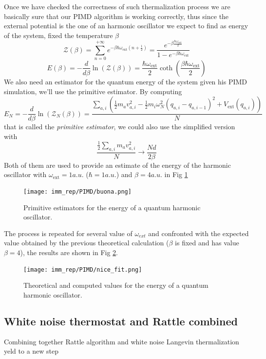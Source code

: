 \documentclass[10pt,a4paper]{article}
\begin{document}
 Once we have checked the correctness of such thermalization process we are basically sure that our PIMD algorithm is working correctly, thus since the external potential is the one of an harmonic oscillator we expect to find as energy of the system, fixed the temperature $\beta$ 
 \[\mathcal{Z}(\beta)= \sum_{n=0}^{+\infty} e^{-\beta\hbar\omega_{\text{ext}}(n+\frac{1}{2})} = \frac{e^{-\beta\frac{\hbar\omega_{\text{ext}}}{2}}}{1-e^{-\beta\hbar\omega_{\text{ext}}}}  \]
 \[E(\beta)= -\frac{d}{d\beta}\ln(\mathcal Z(\beta)) = \frac{\hbar\omega_{\text{ext}}}{2}\coth(\frac{\beta\hbar\omega_{\text{ext}}}{2}) \]
 We also need an estimator for the quantum energy of the system given his PIMD simulation, we'll use the primitive estimator. By computing 
 \[E_N = -\frac{d}{d\beta}\ln(\mathcal Z_N (\beta)) = \frac{\sum_{a,i} (\frac{1}{2}m_a v_{a,i}^2 - \frac{1}{2}m_i\omega_N^2(q_{a,i}-q_{a,i-1})^2+V_{\text{ext}}(q_{a,i}))}{N} \]
 that is called the \emph{primitive estimator}, we could also use the simplified version with 
 \[ \frac{\frac{1}{2}\sum_{a,i} m_a v_{a,i}^2}{N} \rightarrow \frac{Nd}{2\beta} \]
 Both of them are used to provide an estimate of the energy of the harmonic oscillator with $\omega_{\text{ext}} = 1 a.u.$  ($\hbar = 1 a.u.$) and $\beta= 4 a.u.$ in Fig \ref{fig: conv}
 \begin{figure}[h]
 	\begin{center}
 		\texttt{[image: imm\_rep/PIMD/buona.png]}
 	\end{center}
 	\caption{Primitive estimators for the energy of a quantum harmonic oscillator.}
 	\label{fig: conv}
 \end{figure}
The process is repeated for several value of $\omega_{ext}$ and confronted with the expected value obtained by the previous theoretical calculation ($\beta$ is fixed and has value $\beta=4$), the results are shown in Fig \ref{fig: nice}.

 \begin{figure}[h]
	\begin{center}
		\texttt{[image: imm\_rep/PIMD/nice\_fit.png]}
	\end{center}
	\caption{Theoretical and computed values for the energy of a quantum harmonic oscillator.}
	\label{fig: nice}
\end{figure}
\subsection{White noise thermostat and Rattle combined}
Combining together Rattle algorithm and white noise Langevin thermalization yeld to a new step 
\end{document}
